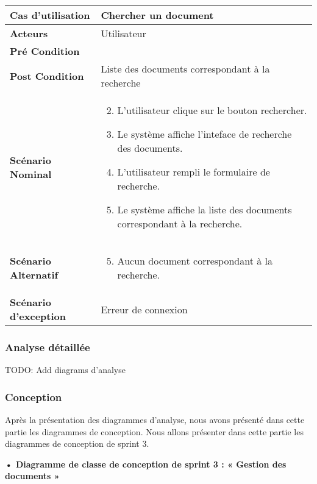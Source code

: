 \begin{longtable}{|p{5cm}|p{10cm}|}
\hline
\textbf{Cas d'utilisation}&Chercher un document\\
\hline
\textbf{Acteurs}&Utilisateur\\
\hline
\textbf{Pré Condition}&\\
\hline
\textbf{Post Condition}&Liste des documents correspondant à la recherche\\
\hline
\textbf{Scénario Nominal}&
\vspace{-\baselineskip}
\begin{enumerate}
    \setcounter{enumi}{1}
    \item L'utilisateur clique sur le bouton rechercher.
    \item Le système affiche l'inteface de recherche des documents.
    \item L'utilisateur rempli le formulaire de recherche.
    \item Le système affiche la liste des documents correspondant à la recherche.
\end{enumerate}\\
\hline
\textbf{Scénario Alternatif}&
\vspace{-\baselineskip}
\begin{enumerate}
    \setcounter{enumi}{4}
    \item Aucun document correspondant à la recherche.
\end{enumerate}\\
\hline
\textbf{Scénario d'exception}&Erreur de connexion\\
\hline
\end{longtable}


\subsubsection{Analyse détaillée}
TODO: Add diagrams d'analyse

\subsubsection{Conception}

Après la présentation des diagrammes d'analyse, nous avons présenté dans cette partie les diagrammes de conception.
Nous allons présenter dans cette partie les diagrammes de conception de sprint 3.

\textbf{•	Diagramme de classe de conception de sprint 3 : « Gestion des documents »}

